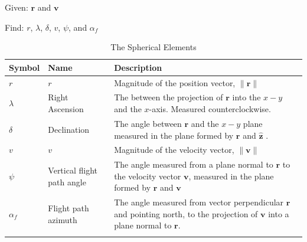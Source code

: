 \noindent Given:  $\mathbf{r}$ and $\mathbf{v}$

\noindent Find:  $r$, $\lambda$, $\delta$, $v$, $\psi$, and
$\alpha_f$

\begin{table} \caption{The Spherical Elements}
\centering {}
\begin{tabular}{p{.5 in} p{1.5 in} p{3.5 in}}
  \hline\hline
   Symbol & Name & Description \\
  \hline
  $r$ & $r$ & Magnitude of the position vector, $\|\mathbf{r}\|$ \\
  $\lambda$ & Right Ascension & The between the projection of $\mathbf{r}$ into the $x-y$ and the $x$-axis.  Measured counterclockwise.   \\
%
  $\delta$ & Declination & The angle between $\mathbf{r}$ and the $x-y$ plane measured in the plane formed by $\mathbf{r}$ and $\hat{\mathbf{z}}$ . \\

  $v$ & $v$ & Magnitude of the velocity vector, $\|\mathbf{v}\|$ \\
  $\psi$ & Vertical flight path angle & The angle measured from a plane normal to $\mathbf{r}$ to the velocity vector $\mathbf{v}$, measured in the plane formed by $\mathbf{r}$  and $\mathbf{v}$   \\
  $\alpha_f$ & Flight path azimuth & The angle measured from vector perpendicular  $\mathbf{r}$ and pointing north, to the projection of $\mathbf{v}$ into a plane normal to $\mathbf{r}$. \\
  \hline\hline \label{Table:SphericalElements}
\end{tabular}
\end{table}

